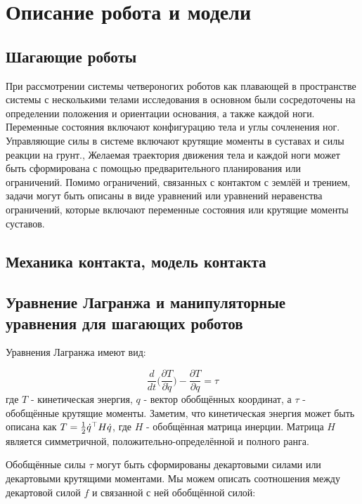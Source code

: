 \chapter{Описание робота и модели}\label{ch:ch2}
\section{Шагающие роботы}\label{sec:ch2/sec1}
При рассмотрении системы четвероногих роботов как плавающей в пространстве системы с несколькими телами исследования в основном были сосредоточены на определении положения и ориентации основания, а также каждой ноги. Переменные состояния включают конфигурацию тела и углы сочленения ног. Управляющие силы в системе включают крутящие моменты в суставах и силы реакции на грунт.\cite{henze2016}, \cite{farshidian2017robust} Желаемая траектория движения тела и каждой ноги может быть сформирована с помощью предварительного планирования или ограничений. Помимо ограничений, связанных с контактом с землёй и трением,\cite{henze2017multi} задачи могут быть описаны в виде уравнений или уравнений неравенства ограничений, которые включают переменные состояния или крутящие моменты суставов. 

\section{Механика контакта, модель контакта}\label{sec:ch2/sect2}
\section{Уравнение Лагранжа и манипуляторные уравнения для шагающих роботов}\label{sec:ch2/sect3}

Уравнения Лагранжа имеют вид:

\begin{equation}
	\frac{d}{dt} \bigg( 
	\frac{\partial T }{\partial \dot{{q}}}
	\bigg) - 
	\frac{\partial T }{\partial {q}} = \tau
\end{equation}
%
где $T$ - кинетическая энергия, ${q}$ - вектор обобщённых координат, а $\tau$ - обобщённые крутящие моменты. Заметим, что кинетическая энергия может быть описана как $T = \frac{1}{2} \dot{{q}}^\top {H} \dot{{q}}$, где ${H}$ - обобщённая матрица инерции. Матрица ${H}$ является симметричной, положительно-определённой и полного ранга.

Обобщённые силы $\tau$ могут быть сформированы декартовыми силами или декартовыми крутящими моментами. Мы можем описать соотношения между декартовой силой ${f}$ и связанной с ней обобщённой силой:


